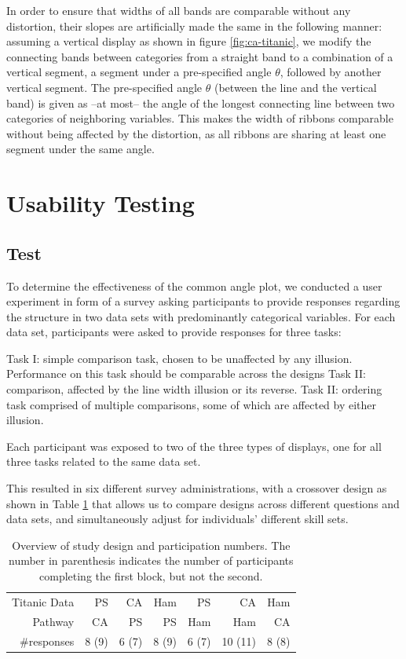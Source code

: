 In order to ensure that  widths of all bands are  comparable without any distortion, their slopes  are artificially made the same in the following manner: 
assuming a vertical display as shown in figure \ref{fig:ca-titanic}, we modify  the connecting bands between  categories from a straight band  to a combination of a vertical  segment, a  segment under a pre-specified angle $\theta$, followed by another vertical  segment.  
The pre-specified angle $\theta$ (between the line and the vertical band) is given as --at most-- the angle of the longest connecting line between two categories of neighboring variables. 
This makes the width of ribbons  comparable without being affected by the distortion, as all ribbons are sharing at least one segment under the same angle. 


\section{Usability Testing}
\subsection{Test}

To determine the effectiveness of the common angle plot, we conducted a user experiment in form of a survey asking participants to provide responses regarding the structure in two data sets with predominantly categorical variables.
For each data set, participants were asked to provide responses for three tasks:

Task I: simple comparison task, chosen to be unaffected by any illusion. Performance on this task should be comparable across the designs
Task II: comparison, affected by the line width illusion or its reverse. 
Task II: ordering task comprised of multiple comparisons, some of which are affected by either illusion.
  
Each participant was exposed to two of the three types of displays, one for all three tasks related to the same data set.
 
This resulted in six different survey administrations, with a crossover design as shown in Table \ref{tab:designs} that allows us to compare designs across different questions and data sets, and  simultaneously adjust for individuals' different skill sets.

\begin{table}[htbp]
\centering
\begin{tabular}{rrrrrrr}
Titanic Data & PS & CA & Ham & PS & CA & Ham \\ 
Pathway & CA & PS & PS & Ham & Ham & CA \\ \hline
\#responses &  8 (9) &  6 (7) &  8 (9) &  6 (7) & 10 (11) & 8 (8)\\ 
\end{tabular}
\caption{\label{tab:designs} Overview of study design and participation numbers. The number in parenthesis indicates the number of participants completing the first block, but not the second.}
\end{table}


